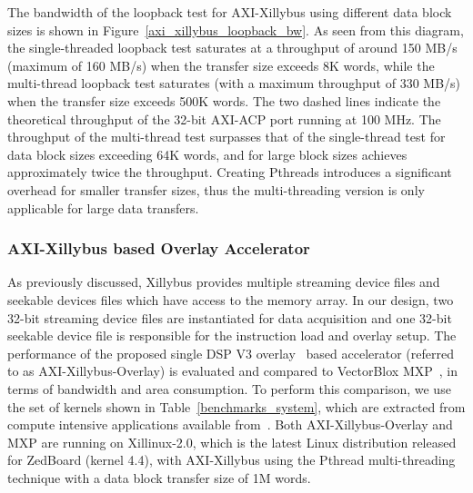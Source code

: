 The bandwidth of the loopback test for AXI-Xillybus using different data block sizes is shown in Figure~\ref{axi_xillybus_loopback_bw}. 
As seen from this diagram, the single-threaded loopback test saturates at a throughput of around 150 MB/s (maximum of 160 MB/s) when the transfer size exceeds 8K words, while the multi-thread loopback test saturates (with a maximum throughput of 330 MB/s) when the transfer size exceeds 500K words. 
The two dashed lines indicate the theoretical throughput of the 32-bit AXI-ACP port running at 100 MHz.
The throughput of the multi-thread test surpasses that of the single-thread test for data block sizes exceeding 64K words, and for large block sizes achieves approximately twice the throughput. 
Creating Pthreads introduces a significant overhead for smaller transfer sizes, thus the multi-threading version is only applicable for large data transfers. 



\subsubsection{AXI-Xillybus based Overlay Accelerator}
As previously discussed, Xillybus provides multiple streaming device files and seekable devices files which have access to the memory array. 
In our design, two 32-bit streaming device files are instantiated for data acquisition and one 32-bit seekable device file is responsible for the instruction load and overlay setup. 
The performance of the proposed single DSP V3 overlay~\cite{li2018time} based accelerator (referred to as AXI-Xillybus-Overlay) is evaluated and compared to VectorBlox MXP~\cite{severance2013embedded}, in terms of bandwidth and area consumption. To perform this comparison, we use the set of kernels shown in Table~\ref{benchmarks_system}, which are extracted from compute intensive applications available from~\cite{gopalakrishnan2007finding, hoy2015performance}. 
Both AXI-Xillybus-Overlay and MXP are running on Xillinux-2.0, which is the latest Linux distribution released for ZedBoard (kernel 4.4), with AXI-Xillybus using the Pthread multi-threading technique with a data block transfer size of 1M words.

